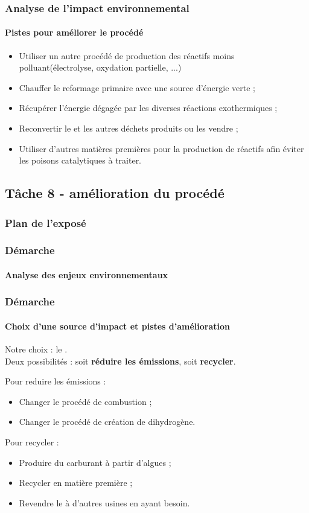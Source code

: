 \documentclass{beamer}
\begin{document}
	\begin{frame}
	\frametitle{Analyse de l'impact environnemental}
	\framesubtitle{Pistes pour améliorer le procédé}
	\begin{itemize}
		\item Utiliser un autre procédé de production des réactifs moins polluant(électrolyse, oxydation partielle, ...)
		\item Chauffer le reformage primaire avec une source d'énergie verte ;
		\item Récupérer l'énergie dégagée par les diverses réactions exothermiques ;
		\item Reconvertir le  et les autres déchets produits ou les vendre ;
		\item Utiliser d'autres matières premières pour la production de réactifs afin éviter les poisons catalytiques à traiter.
	\end{itemize}
	\end{frame}
	
	\begin{frame}
		\section{Tâche 8 - amélioration du procédé}
		\frametitle{Plan de l'exposé}
		\tableofcontents[currentsubsection,sectionstyle=show/shaded,subsectionstyle=show/shaded/hide]
	\end{frame}
	
	\begin{frame}
		\frametitle{Démarche}
		\framesubtitle{Analyse des enjeux environnementaux}
	\end{frame}
	
	\begin{frame}
		\frametitle{Démarche}
		\framesubtitle{Choix d'une source d'impact et pistes d'amélioration} %
		Notre choix : le \chemform{CO_2}.\\
		Deux possibilités : soit \textbf{réduire les émissions}, soit \textbf{recycler}.
		
		Pour reduire les émissions :
		\begin{itemize}
			\item Changer le procédé de combustion ;
			\item Changer le procédé de création de dihydrogène.
		\end{itemize}
		Pour recycler :
		\begin{itemize}
			\item Produire du carburant à partir d'algues ;
			\item Recycler en matière première ;
			\item Revendre le  à d'autres usines
			en ayant besoin.
		\end{itemize}
	\end{frame}
	
\end{document}
